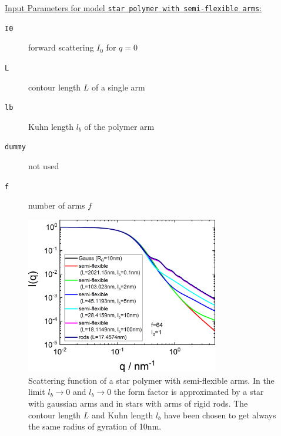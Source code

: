 \vspace{5mm}

\noindent
\uline{Input Parameters for model \texttt{star polymer with semi-flexible arms}:}
\begin{description}
\item[\texttt{I0}] forward scattering $I_0$ for $q=0$
\item[\texttt{L}] contour length $L$ of a single arm
\item[\texttt{lb}] Kuhn length $l_b$ of the polymer arm
\item[\texttt{dummy}] not used
\item[\texttt{f}] number of arms $f$
\end{description}


\begin{figure}[htb]
\begin{center}
\includegraphics[width=0.75\textwidth]{../images/form_factor/stars/StarSemiFlexibleIQ.png}
\end{center}
\caption{Scattering function of a star polymer with semi-flexible arms. In the limit $l_b\rightarrow 0$ and $l_b\rightarrow 0$ the form factor is approximated by a star with gaussian arms and in stars with arms of rigid rods. The contour length $L$ and Kuhn length $l_b$ have been chosen to get always the same radius of gyration of 10nm.} \label{fig:StarSemiFlexible_Iq}
\end{figure}


\clearpage
